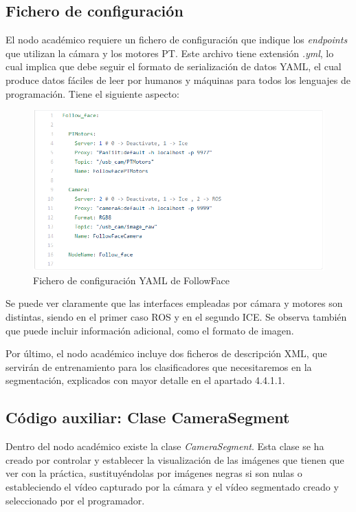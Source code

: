\subsection{Fichero de configuración}
El nodo académico requiere un fichero de configuración que indique los \textit{endpoints} que utilizan la cámara y los motores PT. Este archivo tiene extensión \textit{.yml}, lo cual implica que debe seguir el formato de serialización de datos YAML, el cual produce datos fáciles de leer por humanos y máquinas para todos los lenguajes de programación. Tiene el siguiente aspecto:

\begin{figure}[H]
  \begin{center}
    \includegraphics[width=0.99\linewidth]{figures/ymlfollowface.png}
		\caption{Fichero de configuración YAML de FollowFace}
		\label{fig.followfaceconf}
		\end{center}
\end{figure}

Se puede ver claramente que las interfaces empleadas por cámara y motores son distintas, siendo en el primer caso ROS y en el segundo ICE. Se observa también que puede incluir información adicional, como el formato de imagen.

Por último, el nodo académico incluye dos ficheros de descripción XML, que servirán de entrenamiento para los clasificadores que necesitaremos en la segmentación, explicados con mayor detalle en el apartado 4.4.1.1. 

\subsection{Código auxiliar: Clase CameraSegment}
Dentro del nodo académico existe la clase \textit{CameraSegment}. Esta clase se ha creado por controlar y establecer la visualización de las imágenes que tienen que ver con la práctica, sustituyéndolas por imágenes negras si son nulas o estableciendo el vídeo capturado por la cámara y el vídeo segmentado creado y seleccionado por el programador.

